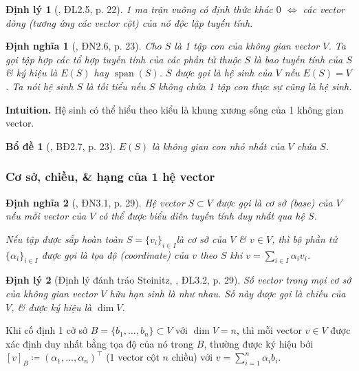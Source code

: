 \documentclass{article}
\newtheorem{bode}{Bổ đề}
\newtheorem{dinhly}{Định lý}
\newtheorem{dinhnghia}{Định nghĩa}
\begin{document}
\begin{dinhly}[\cite{Hoa_linear_algebra}, ĐL2.5, p. 22]
	1 ma trận vuông có định thức khác $0$ $\Leftrightarrow$ các vector dòng (tương ứng các vector cột) của nó độc lập tuyến tính.
\end{dinhly}

\begin{dinhnghia}[\cite{Hoa_linear_algebra}, ĐN2.6, p. 23]
	Cho $S$ là 1 tập con của không gian vector $V$. Ta gọi tập hợp các tổ hợp tuyến tính của các phần tử thuộc $S$ là {\rm bao tuyến tính} của $S$ \& ký hiệu là $E(S)$ hay $\operatorname{span}(S)$. $S$ được gọi là {\rm hệ sinh} của $V$ nếu $E(S) = V$. Ta nói hệ sinh $S$ là {\rm tối tiểu} nếu $S$ không chứa 1 tập con thực sự cũng là hệ sinh.
\end{dinhnghia}
{\bf Intuition.} Hệ sinh có thể hiểu theo kiểu là khung xương sống của 1 không gian vector.

\begin{bode}[\cite{Hoa_linear_algebra}, BĐ2.7, p. 23]
	$E(S)$ là không gian con nhỏ nhất của $V$ chứa $S$.
\end{bode}


\subsubsection{Cơ sở, chiều, \& hạng của 1 hệ vector}

\begin{dinhnghia}[\cite{Hoa_linear_algebra}, ĐN3.1, p. 29]
	Hệ vector $S\subset V$ được gọi là {\rm cơ sở (base)}  của $V$ nếu mỗi vector của $V$ có thể được biểu diễn tuyến tính duy nhất qua hệ $S$.
	
	Nếu tập được sắp hoàn toàn $S = \{v_i\}_{i\in I}$là cơ sở của $V$ \& $v\in V$, thì bộ phần tử $\{\alpha_i\}_{i\in I}$ được gọi là {\rm tọa độ (coordinate)} của $v$ theo $S$ khi $v = \sum_{i\in I} \alpha_iv_i$.
\end{dinhnghia}

\begin{dinhly}[Định lý đánh tráo Steinitz, \cite{Hoa_linear_algebra}, ĐL3.2, p. 29]
	Số vector trong mọi cơ sở của không gian vector $V$ hữu hạn sinh là như nhau. Số này được gọi là chiều của $V$, \& được ký hiệu là $\dim V$.
\end{dinhly}
Khi cố định 1 cở sở $B = \{b_1,\ldots,b_n\}\subset V$ với $\dim V = n$, thì mỗi vector $v\in V$ được xác định duy nhất bằng tọa độ của nó trong $B$, thường được ký hiệu bởi $[v]_B\coloneqq(\alpha_1,\ldots,\alpha_n)^\top$ (1 vector cột $n$ chiều) với $v = \sum_{i=1}^n \alpha_ib_i$.
\end{document}
